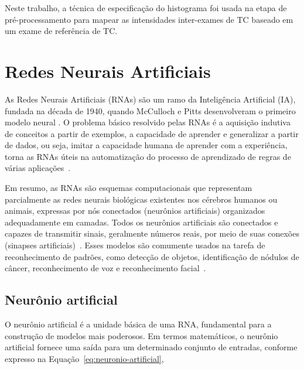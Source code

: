 Neste trabalho, a técnica de especificação do histograma foi usada na etapa de pré-processamento para mapear as intensidades inter-exames de TC baseado em um exame de referência de TC.

\section{Redes Neurais Artificiais}
\label{sec:redes-neurais-artificiais}

As Redes Neurais Artificiais (RNAs) são um ramo da Inteligência Artificial (IA), fundada na década de 1940, quando McCulloch e Pitts desenvolveram o primeiro modelo neural \cite{mcculloch1943logical}. O problema básico resolvido pelas RNAs é a aquisição indutiva de conceitos a partir de exemplos, a capacidade de aprender e generalizar a partir de dados, ou seja, imitar a capacidade humana de aprender com a experiência, torna as RNAs úteis na automatização do processo de aprendizado de regras de várias aplicações~\cite{MUKHOPADHYAY2011329}. 


Em resumo, as RNAs são esquemas computacionais que representam parcialmente as redes neurais biológicas existentes nos cérebros humanos ou animais, expressas por nós conectados (neurônios artificiais) organizados adequadamente em camadas. Todos os neurônios artificiais são conectados e capazes de transmitir sinais, geralmente números reais, por meio de suas conexões (sinapses artificiais)~\cite{MUKHOPADHYAY2011329,BERSIMIS201931}. Esses modelos são comumente usados na tarefa de reconhecimento de padrões, como detecção de objetos, identificação de nódulos de câncer, reconhecimento de voz e reconhecimento facial~\cite{alanis2019artificial,baroni2020linguistic}.

\subsection{Neurônio artificial}
\label{sec:neuronio-artificial}

O neurônio artificial é a unidade básica de uma RNA, fundamental para a construção de modelos mais poderosos. Em termos matemáticos, o neurônio artificial fornece uma saída para um determinado conjunto de entradas, conforme expresso na Equação~\ref{eq:neuronio-artificial},

